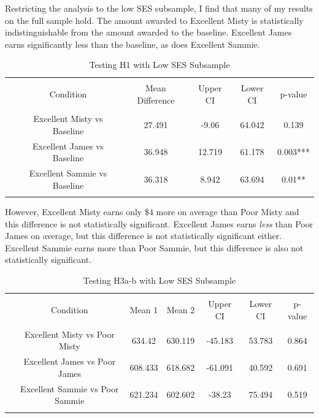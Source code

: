 \documentclass[12pt]{article}%
\begin{document}
\begin{doublespace}
Restricting the analysis to the low SES subsample, I find that many of my results on the full sample hold. The amount awarded to Excellent Misty is statistically indistinguishable from the amount awarded to the baseline. Excellent James earns significantly less than the baseline, as does Excellent Sammie.


\begin{table}[!htbp] \centering 
	\caption{Testing H1 with Low SES Subsample} 
	\label{} 
	\footnotesize 
	\begin{tabular}{@{\extracolsep{1pt}} cccccc} 
		\\[-1.8ex]\hline \\[-1.8ex] 
		& Condition & Mean Difference & Upper CI & Lower CI & p-value \\ 
		\hline \\[-1.8ex] 
		 & Excellent Misty vs Baseline & 27.491 & -9.06 & 64.042 & 0.139 \\ 
		 & Excellent James vs Baseline & 36.948 & 12.719 & 61.178 & 0.003*** \\ 
		 & Excellent Sammie vs Baseline & 36.318 & 8.942 & 63.694 & 0.01** \\ 
		\hline \\[-1.8ex] 
	\end{tabular} 
\end{table} 

However, Excellent Misty earns only \$4 more on average than Poor Misty and this difference is not statistically significant. Excellent James earns \textit{less} than Poor James on average, but this difference is not statistically significant either. Excellent Sammie earns more than Poor Sammie, but this difference is also not statistically significant.

\begin{table}[!htbp] \centering 
	\caption{Testing H3a-b with Low SES Subsample} 
	\label{} 
	\footnotesize 
	\begin{tabular}{@{\extracolsep{1pt}} ccccccc} 
		\\[-1.8ex]\hline \\[-1.8ex] 
		& Condition & Mean 1 & Mean 2 & Upper CI & Lower CI & p-value \\ 
		\hline \\[-1.8ex] 
		 & Excellent Misty vs Poor Misty & 634.42 & 630.119 & -45.183 & 53.783 & 0.864 \\ 
		 & Excellent James vs Poor James & 608.433 & 618.682 & -61.091 & 40.592 & 0.691 \\ 
		 & Excellent Sammie vs Poor Sammie & 621.234 & 602.602 & -38.23 & 75.494 & 0.519 \\ 
		\hline \\[-1.8ex] 
	\end{tabular} 
\end{table} 


\end{doublespace}
\end{document}

